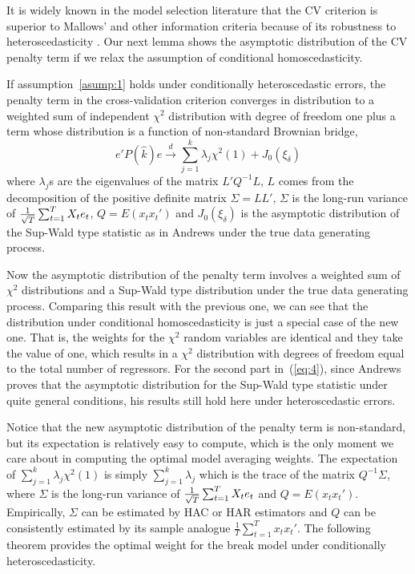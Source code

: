 It is widely known in the model selection literature that the CV criterion is superior to Mallows' and other information criteria because of its robustness to heteroscedasticity \cite{andrews_JE1991}. Our next lemma shows the asymptotic distribution of the CV penalty term if we relax the assumption of conditional homoscedasticity.
\begin{lemma} \label{thm:2}
If assumption~\ref{asump:1} holds under conditionally heteroscedastic errors, the penalty term in the cross-validation criterion converges in distribution to a weighted sum of independent $\chi^2$ distribution with degree of freedom one plus a term whose distribution is a function of non-standard Brownian bridge,
\begin{equation} \label{eq:4}
	e'P(\hat{k})e \stackrel{d}{\rightarrow} \sum_{j=1}^{k} \lambda_j \chi^2(1) + J_0(\xi_{\delta})
\end{equation}
where $\lambda_j$s are the eigenvalues of the matrix $L'Q^{-1}L$, $L$ comes from the decomposition of the positive definite matrix $\Sigma = LL'$, $\Sigma$ is the long-run variance of $\frac{1}{\sqrt{T}}\sum_{t=1}^{T} X_t e_t$, $Q = E(x_t x_t')$ and $J_0(\xi_{\delta})$ is the asymptotic distribution of the Sup-Wald type statistic as in Andrews \cite{andrews93} under the true data generating process.
\end{lemma}
Now the asymptotic distribution of the penalty term involves a weighted sum of $\chi^2$ distributions and a Sup-Wald type distribution under the true data generating process. Comparing this result with the previous one, we can see that the distribution under conditional homoscedasticity is just a special case of the new one. That is, the weights for the $\chi^2$ random variables are identical and they take the value of one, which results in a $\chi^2$ distribution with degrees of freedom equal to the total number of regressors. For the second part in~(\ref{eq:4}), since Andrews \cite{andrews93} proves that the asymptotic distribution for the Sup-Wald type statistic under quite general conditions, his results still hold here under heteroscedastic errors.

Notice that the new asymptotic distribution of the penalty term is non-standard, but its expectation is relatively easy to compute, which is the only moment we care about in computing the optimal model averaging weights. The expectation of $\sum_{j=1}^{k} \lambda_j \chi^2(1)$ is simply $\sum_{j=1}^{k} \lambda_j$ which is the trace of the matrix $Q^{-1} \Sigma$, where $\Sigma$ is the long-run variance of $\frac{1}{\sqrt{T}}\sum_{t=1}^{T} X_t e_t$ and $Q = E(x_t x_t')$. Empirically, $\Sigma$ can be estimated by HAC or HAR estimators and $Q$ can be consistently estimated by its sample analogue $\frac{1}{T}\sum_{t=1}^{T}x_t x_t'$. The following theorem provides the optimal weight for the break model under conditionally heteroscedasticity.

